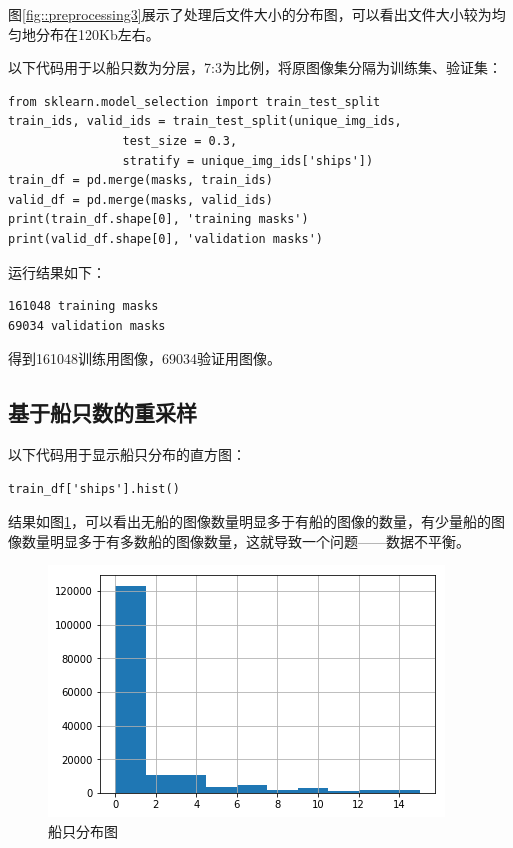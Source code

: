 图\ref{fig::preprocessing3}展示了处理后文件大小的分布图，可以看出文件大小较为均匀地分布在120Kb左右。

以下代码用于以船只数为分层，7:3为比例，将原图像集分隔为训练集、验证集：

\begin{lstlisting}
from sklearn.model_selection import train_test_split
train_ids, valid_ids = train_test_split(unique_img_ids, 
                test_size = 0.3, 
                stratify = unique_img_ids['ships'])
train_df = pd.merge(masks, train_ids)
valid_df = pd.merge(masks, valid_ids)
print(train_df.shape[0], 'training masks')
print(valid_df.shape[0], 'validation masks')
\end{lstlisting}

运行结果如下：

\begin{lstlisting}
161048 training masks
69034 validation masks
\end{lstlisting}

得到161048训练用图像，69034验证用图像。

\subsection{基于船只数的重采样}

以下代码用于显示船只分布的直方图：

\begin{lstlisting}
train_df['ships'].hist()
\end{lstlisting}

结果如图\ref{fig::preprocessing4}，可以看出无船的图像数量明显多于有船的图像的数量，有少量船的图像数量明显多于有多数船的图像数量，这就导致一个问题------数据不平衡。

\begin{figure}
\centering
\includegraphics[width=0.7\linewidth]{body/preprocessing_pic/4}
\caption{船只分布图}
\label{fig::preprocessing4}
\end{figure}

